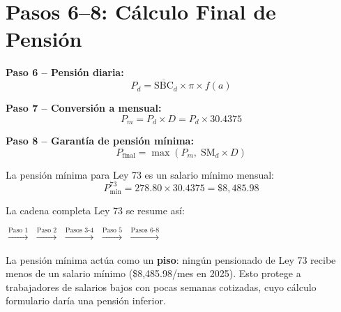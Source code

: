 \documentclass[11pt,a4paper]{report}
\theoremstyle{remark}
\begin{document}
\section{Pasos 6--8: C\'alculo Final de Pensi\'on}

\begin{tcolorbox}[colback=blue!5!white, colframe=blue!75!black, title=\textbf{Definici\'on Formal}]
\textbf{Paso 6 -- Pensi\'on diaria:}
\begin{equation}
P_d = \overline{\text{SBC}}_d \times \pi \times f(a)
\label{eq:pension_diaria}
\end{equation}

\textbf{Paso 7 -- Conversi\'on a mensual:}
\begin{equation}
P_m = P_d \times D = P_d \times 30.4375
\label{eq:pension_mensual_73}
\end{equation}

\textbf{Paso 8 -- Garant\'ia de pensi\'on m\'inima:}
\begin{equation}
P_{\text{final}} = \max(P_m, \; \text{SM}_d \times D)
\label{eq:pension_final_73}
\end{equation}

La pensi\'on m\'inima para Ley 73 es un salario m\'inimo mensual:
\begin{equation}
P_{\min}^{73} = 278.80 \times 30.4375 = \$8{,}485.98
\end{equation}
\end{tcolorbox}

\begin{tcolorbox}[colback=green!5!white, colframe=green!50!black, title=\textbf{Intuici\'on}]
La cadena completa Ley 73 se resume as\'i:

\begin{center}
 $\xrightarrow{\text{Paso 1}}$  $\xrightarrow{\text{Paso 2}}$  $\xrightarrow{\text{Pasos 3-4}}$  $\xrightarrow{\text{Paso 5}}$  $\xrightarrow{\text{Pasos 6-8}}$ 
\end{center}

La pensi\'on m\'inima act\'ua como un \textbf{piso}: ning\'un pensionado de Ley 73 recibe menos de un salario m\'inimo (\$8,485.98/mes en 2025). Esto protege a trabajadores de salarios bajos con pocas semanas cotizadas, cuyo c\'alculo formulario dar\'ia una pensi\'on inferior.
\end{tcolorbox}
\end{document}
